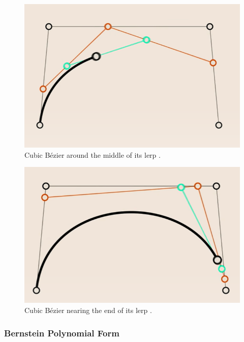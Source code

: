 \documentclass[letterpaper, 12pt]{article}
\begin{document}
\begin{paracol}{2}
    \begin{figure}[H]
        \centering
        \includegraphics[width=.95\linewidth]{cubic_ill_mid.png}
        \caption{Cubic Bézier around the middle of its lerp \protect\cite{holmerBeautyBezierCurves2021}.}
        \label{fig:cubic_ill_mid}
    \end{figure}
    \switchcolumn
    \begin{figure}[H]
        \centering
        \includegraphics[width=\linewidth]{cubic_ill_end.png}
        \caption{Cubic Bézier nearing the end of its lerp \protect\cite{holmerBeautyBezierCurves2021}.}
        \label{fig:cubic_ill_end}
    \end{figure}

\end{paracol}

\subsubsection{Bernstein Polynomial Form}
\end{document}
